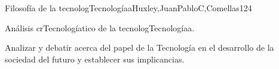 \begin{syllabus}
\begin{unit}{Filosofía de la tecnologTecnologíaa}{Huxley,JuanPabloC,Comellas}{12}{4}
\begin{topics}
      \item {Análisis crTecnologíatico de la tecnologTecnologíaa.}
\end{topics}
\begin{unitgoals}
	\item Analizar  y debatir acerca del papel de la Tecnología en el desarrollo de la sociedad del futuro y establecer  sus implicancias. 
\end{unitgoals}
\end{unit}



\begin{coursebibliography}
\end{coursebibliography}

\end{syllabus}

%
